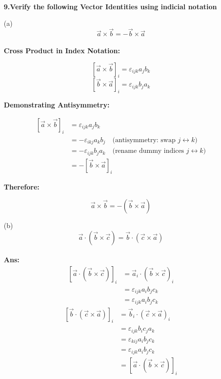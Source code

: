 \documentclass[a4paper,12pt]{article}
\begin{document}
\begin{enumerate}


\textbf{9.Verify the following Vector Identities using indicial notation}


\item[(a)]
\[
\vec{a} \times\vec{b} =-\vec{b} \times \vec{a}
\]\\




\textbf{Cross Product in Index Notation:}

\[
[\vec{a} \times \vec{b}]_i = \varepsilon_{ijk} a_j b_k
\]
\[
[\vec{b} \times \vec{a}]_i = \varepsilon_{ijk} b_j a_k
\]

\textbf{Demonstrating Antisymmetry:}

\[
\begin{aligned}
[\vec{a} \times \vec{b}]_i &= \varepsilon_{ijk} a_j b_k \\
&= -\varepsilon_{ikj} a_k b_j \quad \text{(antisymmetry: swap } j \leftrightarrow k) \\
&= -\varepsilon_{ijk} b_j a_k \quad \text{(rename dummy indices } j \leftrightarrow k) \\
&= -[\vec{b} \times \vec{a}]_i
\end{aligned}
\]

\textbf{Therefore:}

\[
\boxed{\vec{a} \times \vec{b} = -(\vec{b} \times \vec{a})}
\]




 



\item[(b)]
\[
\vec{a} \cdot (\vec{b} \times \vec{c}) = \vec{b} \cdot (\vec{c} \times \vec{a})
\]\\
\textbf{Ans:}\\

\[
\begin{aligned}
[\vec{a} \cdot (\vec{b} \times \vec{c})]_{i}
&=\vec{a}_i \cdot (\vec{b} \times \vec{c})_{i}\\
&=\varepsilon_{ijk} a_i  b_j  c_k\\
&= \varepsilon_{ijk} a_i b_j c_k
\end{aligned}
\]
\[
\begin{aligned}
[\vec{b} \cdot (\vec{c} \times \vec{a})]_i 
&=\vec{b}_i \cdot (\vec{c} \times \vec{a})_{i}\\
&= \varepsilon_{ijk} b_i c_j a_k\\
&= \varepsilon_{kij} a_i b_j c_k\\
&=\varepsilon_{ijk} a_i b_j c_k\\
&=[\vec{a} \cdot (\vec{b} \times \vec{c})]_{i}
\end{aligned}
\]


\end{enumerate}
\end{document}
